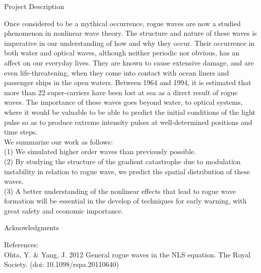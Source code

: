 \documentclass[final]{beamer}
\begin{document}
\begin{frame}{}
\begin{columns}[t]
\begin{column}{.255\linewidth}
		\begin{block}{Project Description}

Once considered to be a mythical occurrence, rogue waves are now a studied phenomenon in nonlinear wave theory. The structure and nature of these waves is imperative in our understanding of how and why they occur. Their occurrence in both water and optical waves, although neither periodic nor obvious, has an affect on our everyday lives. They are known to cause extensive damage, and are even life-threatening, when they come into contact with ocean liners and passenger ships in the open waters. Between 1964 and 1994, it is estimated that more than 22 super-carriers have been lost at sea as a direct result of rogue waves. The importance of these waves goes beyond water, to optical systems, where it would be valuable to be able to predict the initial conditions of the light pulse so as to produce extreme intensity pulses at well-determined positions and time steps.\\

\vspace{0.5cm}
We summarize our work as follows:\\
		
		\vspace{.5cm}
(1) We simulated higher order waves than previously possible.\\

			\vspace{.5cm}
(2) By studying the structure of the gradient catastrophe due to modulation instability in relation to rogue wave, we predict the spatial distribution of these waves.\\

			\vspace{.5cm}	
(3) A better understanding of the nonlinear effects that lead to rogue wave formation will be essential in the develop of techniques for early warning, with great safety and economic importance.\\

\vspace{1cm}
\end{block}
\vspace{1cm}
	\begin{block}{Acknowledgments}
	

{\small References:}\\

{\footnotesize Ohta, Y. \& Yang, J. 2012 General rogue waves in the NLS equation. The Royal Society. (doi: 10.1098/rspa.20110640)}\\


\end{block}
\end{column}
\end{columns}
\end{frame}
\end{document}
